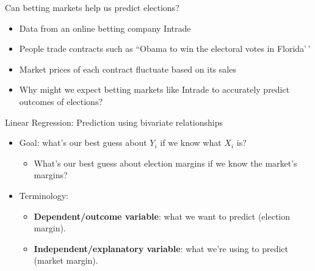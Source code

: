 \documentclass[
  ignorenonframetext,
]{beamer}
\providecommand{\tightlist}{%
  \setlength{\itemsep}{0pt}\setlength{\parskip}{0pt}}
\begin{document}
\begin{frame}{Can betting markets help us predict elections?}
\label{can-betting-markets-help-us-predict-elections}
\pause

\begin{itemize}
\tightlist
\item
  Data from an online betting company Intrade \pause
\item
  People trade contracts such as ``Obama to win the electoral votes in
  Florida'\,' \pause
\item
  Market prices of each contract fluctuate based on its sales \pause
\item
  Why might we expect betting markets like Intrade to accurately predict
  outcomes of elections?
\end{itemize}
\end{frame}

\begin{frame}{Linear Regression: Prediction using bivariate
relationships}
\label{linear-regression-prediction-using-bivariate-relationships}
\pause

\begin{itemize}
\tightlist
\item
  Goal: what's our best guess about \(Y_i\) if we know what \(X_i\) is?
  \pause

  \begin{itemize}
  \tightlist
  \item
    What's our best guess about election margins if we know the market's
    margins? \pause
  \end{itemize}
\item
  Terminology:

  \begin{itemize}
  \tightlist
  \item
    \textbf{Dependent/outcome variable}: what we want to predict
    (election margin). \pause
  \item
    \textbf{Independent/explanatory variable}: what we're using to
    predict (market margin).
  \end{itemize}
\end{itemize}
\end{frame}
\end{document}
